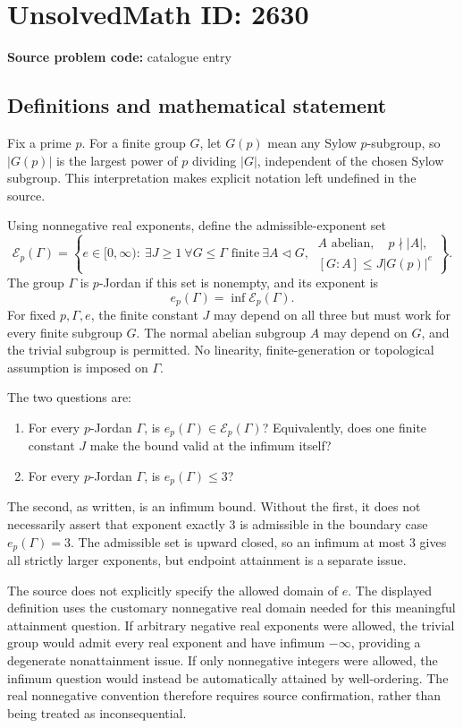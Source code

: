 \documentclass[11pt]{article}
\begin{document}
\section*{UnsolvedMath ID: 2630}
\textbf{Source problem code:} catalogue entry
\subsection{Definitions and mathematical statement}
Fix a prime $p$. For a finite group $G$, let $G(p)$ mean any Sylow $p$-subgroup, so $|G(p)|$ is the largest power of $p$ dividing $|G|$, independent of the chosen Sylow subgroup. This interpretation makes explicit notation left undefined in the source.

Using nonnegative real exponents, define the admissible-exponent set
\[
 \mathcal E_p(\Gamma)=\left\{e\in[0,\infty):\ \exists J\ge1\
 \forall G\le\Gamma\text{ finite}\ \exists A\triangleleft G,
 \ \begin{gathered}
 A\text{ abelian},\quad p\nmid|A|,\\
 [G:A]\le J|G(p)|^e
 \end{gathered}\right\}.
\]
The group $\Gamma$ is $p$-Jordan if this set is nonempty, and its exponent is
\[
 e_p(\Gamma)=\inf\mathcal E_p(\Gamma).
\]
For fixed $p,\Gamma,e$, the finite constant $J$ may depend on all three but must work for every finite subgroup $G$. The normal abelian subgroup $A$ may depend on $G$, and the trivial subgroup is permitted. No linearity, finite-generation or topological assumption is imposed on $\Gamma$.

The two questions are:
\begin{enumerate}
\item For every $p$-Jordan $\Gamma$, is $e_p(\Gamma)\in\mathcal E_p(\Gamma)$? Equivalently, does one finite constant $J$ make the bound valid at the infimum itself?
\item For every $p$-Jordan $\Gamma$, is $e_p(\Gamma)\le3$?
\end{enumerate}
The second, as written, is an infimum bound. Without the first, it does not necessarily assert that exponent exactly $3$ is admissible in the boundary case $e_p(\Gamma)=3$. The admissible set is upward closed, so an infimum at most $3$ gives all strictly larger exponents, but endpoint attainment is a separate issue.

The source does not explicitly specify the allowed domain of $e$. The displayed definition uses the customary nonnegative real domain needed for this meaningful attainment question. If arbitrary negative real exponents were allowed, the trivial group would admit every real exponent and have infimum $-\infty$, providing a degenerate nonattainment issue. If only nonnegative integers were allowed, the infimum question would instead be automatically attained by well-ordering. The real nonnegative convention therefore requires source confirmation, rather than being treated as inconsequential.
\end{document}
